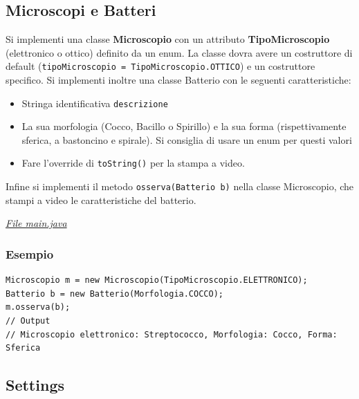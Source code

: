 \documentclass{article}
\begin{document}
\subsection{Microscopi e Batteri}
Si implementi una classe \textbf{Microscopio} con un attributo \textbf{TipoMicroscopio} (elettronico o ottico) definito da un enum.
La classe dovra avere un costruttore di default (\texttt{tipoMicroscopio = TipoMicroscopio.OTTICO}) e un costruttore specifico.
Si implementi inoltre una classe Batterio con le seguenti caratteristiche:
\begin{itemize}
    \item Stringa identificativa \texttt{descrizione}
    \item La sua morfologia (Cocco, Bacillo o Spirillo) e la sua forma (rispettivamente sferica, a bastoncino e spirale). Si consiglia di usare un enum per questi valori
    \item Fare l'override di \texttt{toString()} per la stampa a video.
\end{itemize}
Infine si implementi il metodo \texttt{osserva(Batterio b)} nella classe Microscopio, che stampi a video le caratteristiche del batterio. 

\noindent \href{https://raw.githubusercontent.com/alterax05/Tutorati-P2/refs/heads/main/tutorato%201%2011-03/1TutP2/src/es2_OOP/Main.java}{\textit{File main.java}}

\subsubsection*{Esempio}
\begin{verbatim}
Microscopio m = new Microscopio(TipoMicroscopio.ELETTRONICO);
Batterio b = new Batterio(Morfologia.COCCO);
m.osserva(b);
// Output
// Microscopio elettronico: Streptococco, Morfologia: Cocco, Forma: Sferica
\end{verbatim}



\subsection{Settings}
\end{document}
